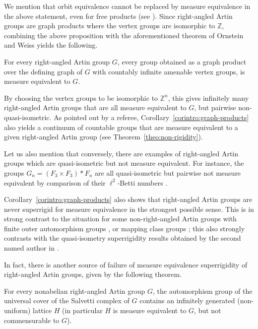 We mention that orbit equivalence cannot be replaced by measure equivalence in the above statement, even for free products (see \cite[\S 2.2]{Gab}). Since right-angled Artin groups are graph products where the vertex groups are isomorphic to $\mathbb{Z}$, combining the above proposition with the aforementioned theorem of Ornstein and Weiss \cite{OW} yields the following.

\begin{corintro}\label{corintro:graph-products}
For every right-angled Artin group $G$, every group obtained as a graph product over the defining graph of $G$ with countably infinite amenable vertex groups, is measure equivalent to $G$.
\end{corintro}

By choosing the vertex groups to be isomorphic to $\mathbb{Z}^n$, this gives infinitely many right-angled Artin groups that are all measure equivalent to $G$, but pairwise non-quasi-isometric. As pointed out by a referee, Corollary~\ref{corintro:graph-products} also yields a continuum of countable groups that are measure equivalent to a given right-angled Artin group (see Theorem~\ref{theo:non-rigidity}).

Let us also mention that conversely, there are examples of right-angled Artin groups which are quasi-isometric but not measure equivalent. For instance, the groups $G_n=(F_3\times F_3)\ast F_n$ are all quasi-isometric \cite[Th.\,1.5]{Why} but pairwise not measure equivalent by comparison of their $\ell^2$-Betti numbers \cite[Cor.\,0.3]{Gab-betti}.

Corollary~\ref{corintro:graph-products} also shows that right-angled Artin groups are never superrigid for measure equivalence in the strongest possible sense. This is in strong contrast to the situation for some non-right-angled Artin groups with finite outer automorphism groups \cite{HH}, or mapping class groups \cite{Kid}; this also strongly contrasts with the quasi-isometry superrigidity results obtained by the second named author in \cite{Hua2}.

In fact, there is another source of failure of measure equivalence superrigidity of right-angled Artin groups, given by the following theorem.

\begin{theointro}\label{theointro-non-superrigid}
For every nonabelian right-angled Artin group $G$, the automorphism group of the universal cover of the Salvetti complex of $G$ contains an infinitely generated (non-uniform) lattice $H$ (in particular $H$ is measure equivalent to $G$, but not commensurable to $G$).
\end{theointro}

